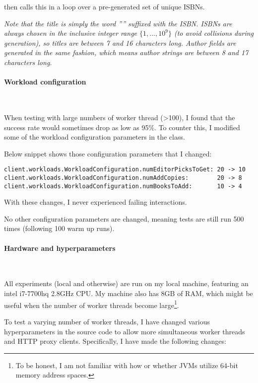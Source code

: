  then calls this in a loop over a pre-generated set of
unique ISBNs. \medskip

\textit{Note that the title is simply the word '''' suffixed with the ISBN.
ISBNs are always chosen in the inclusive integer range $\{1,..., 10^9\}$ (to
avoid collisions during generation), so titles are between 7 and 16 characters
long. Author fields are generated in the same fashion, which means author
strings are between 8 and 17 characters long.}

\paragraph{Workload configuration}~\smallskip

When testing with large numbers of worker thread (>100), I found that the
success rate would sometimes drop as low as 95\%. To counter this, I modified
some of the workload configuration parameters in the 
class. \medskip

Below snippet shows those configuration parameters that I changed:

\begin{verbatim}
client.workloads.WorkloadConfiguration.numEditorPicksToGet: 20 -> 10
client.workloads.WorkloadConfiguration.numAddCopies:        20 -> 8
client.workloads.WorkloadConfiguration.numBooksToAdd:       10 -> 4
\end{verbatim}

With these changes, I never experienced failing interactions. \medskip

No other configuration parameters are changed, meaning tests are still run 500
times (following 100 warm up runs).


\paragraph{Hardware and hyperparameters}~\smallskip

All experiments (local and otherwise) are run on my local machine, featuring an
intel i7-7700hq 2.8GHz CPU. My machine also has 8GB of RAM, which might be
useful when the number of worker threads become large\footnote{To be honest, I
am not familiar with how or whether JVMs utilize 64-bit memory address spaces.}.
\medskip

To test a varying number of worker threads, I have changed various
hyperparameters in the source code to allow more simultaneous worker threads and
HTTP proxy clients. Specifically, I have made the following changes:

